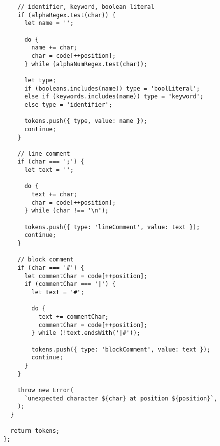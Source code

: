 \begin{verbatim}
    // identifier, keyword, boolean literal
    if (alphaRegex.test(char)) {
      let name = '';

      do {
        name += char;
        char = code[++position];
      } while (alphaNumRegex.test(char));

      let type;
      if (booleans.includes(name)) type = 'boolLiteral';
      else if (keywords.includes(name)) type = 'keyword';
      else type = 'identifier';

      tokens.push({ type, value: name });
      continue;
    }

    // line comment
    if (char === ';') {
      let text = '';

      do {
        text += char;
        char = code[++position];
      } while (char !== '\n');

      tokens.push({ type: 'lineComment', value: text });
      continue;
    }

    // block comment
    if (char === '#') {
      let commentChar = code[++position];
      if (commentChar === '|') {
        let text = '#';

        do {
          text += commentChar;
          commentChar = code[++position];
        } while (!text.endsWith('|#'));

        tokens.push({ type: 'blockComment', value: text });
        continue;
      }
    }

    throw new Error(
      `unexpected character ${char} at position ${position}`,
    );
  }

  return tokens;
};
\end{verbatim}

